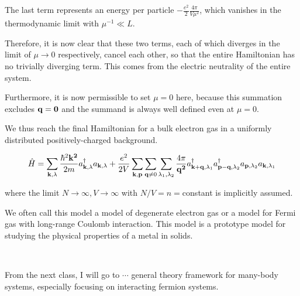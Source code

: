The last term represents an energy per particle $-\displaystyle\frac{e^2}{2}\frac{4\pi}{V\mu^2}$, which vanishes in the thermodynamic limit with $\mu^{-1}\ll L$. 

Therefore, it is now clear that these two terms, each of which diverges in the limit of $\mu\to0$ respectively, cancel each other, so that the entire Hamiltonian has no trivially diverging term. This comes from the electric neutrality of the entire system. 

Furthermore, it is now permissible to set $\mu=0$ here, because this summation excludes $\bf q=0$ and the summand is always well defined even at $\mu =0$. 

We thus reach the final Hamiltonian for a bulk electron gas in a uniformly distributed positively-charged background. 

\begin{align}\label{eq1.8.14}
\hat{H}=\sum_{{\bf k},\lambda}\frac{\hbar^2\bf k^2}{2m}a^\dagger_{{\bf k},\lambda}a_{{\bf k},\lambda} + \frac{e^2}{2V}\sum_{\bf k,p} \sum_{{\bf q}\neq0}\sum_{\lambda_1,\lambda_2}\frac{4\pi}{{\bf q^2}}a^\dagger_{{\bf k+q},\lambda_1}a^\dagger_{{\bf p-q},\lambda_2}a_{{\bf p},\lambda_2}a_{{\bf k},\lambda_1}
\end{align}

where the limit $N\to\infty, V\to\infty$ with $N/V=n=$constant is implicitly assumed. 

We often call this model a model of degenerate electron gas or a model for Fermi gas with long-range Coulomb interaction. This model is a prototype model for studying the physical properties of a metal in solids. 

\dotfill

\ 

From the next class, I will go to $\cdots$ general theory framework for many-body systems, especially focusing on interacting fermion systems.
